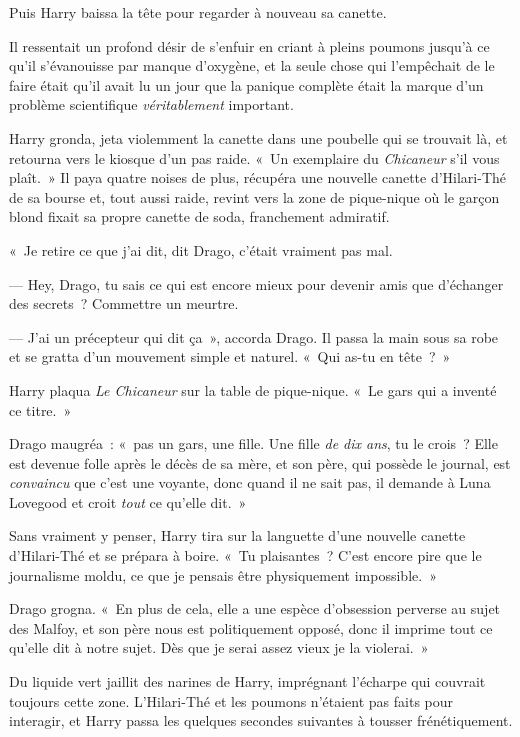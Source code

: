 Puis Harry baissa la tête pour regarder à nouveau sa canette.

Il ressentait un profond désir de s'enfuir en criant à pleins poumons jusqu'à ce qu'il s'évanouisse par manque d'oxygène, et la seule chose qui l'empêchait de le faire était qu'il avait lu un jour que la panique complète était la marque d'un problème scientifique \emph{véritablement} important.

Harry gronda, jeta violemment la canette dans une poubelle qui se trouvait là, et retourna vers le kiosque d'un pas raide.
«~Un exemplaire du \emph{Chicaneur} s'il vous plaît.~»
Il paya quatre noises de plus, récupéra une nouvelle canette d'Hilari-Thé de sa bourse et, tout aussi raide, revint vers la zone de pique-nique où le garçon blond fixait sa propre canette de soda, franchement admiratif.

«~Je retire ce que j'ai dit, dit Drago, c'était vraiment pas mal.

--- Hey, Drago, tu sais ce qui est encore mieux pour devenir amis que d'échanger des secrets~? Commettre un meurtre.

--- J'ai un précepteur qui dit ça~», accorda Drago. Il passa la main sous sa robe et se gratta d'un mouvement simple et naturel. «~Qui as-tu en tête~?~»

Harry plaqua \emph{Le Chicaneur} sur la table de pique-nique. «~Le gars qui a inventé ce titre.~»

Drago maugréa~: «~pas un gars, une fille. Une fille \emph{de dix ans}, tu le crois~?
Elle est devenue folle après le décès de sa mère, et son père, qui possède le journal, est \emph{convaincu} que c'est une voyante, donc quand il ne sait pas, il demande à Luna Lovegood et croit \emph{tout} ce qu'elle dit.~»

Sans vraiment y penser, Harry tira sur la languette d'une nouvelle canette d'Hilari-Thé et se prépara à boire.
«~Tu plaisantes~? C'est encore pire que le journalisme moldu, ce que je pensais être physiquement impossible.~»

Drago grogna. «~En plus de cela, elle a une espèce d'obsession perverse au sujet des Malfoy, et son père nous est politiquement opposé, donc il imprime tout ce qu'elle dit à notre sujet. Dès que je serai assez vieux je la violerai.~»

Du liquide vert jaillit des narines de Harry, imprégnant l'écharpe qui couvrait toujours cette zone.
L'Hilari-Thé et les poumons n'étaient pas faits pour interagir, et Harry passa les quelques secondes suivantes à tousser frénétiquement.

